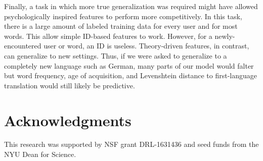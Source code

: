 \documentclass[11pt,a4paper]{article}
\begin{document}
Finally, a task in which more true generalization was required might have
allowed psychologically inspired features to perform more competitively. In this
task, there is a large amount of labeled training data for every user and for
most words. This allow simple ID-based features to work. However, for a
newly-encountered user or word, an ID is useless. Theory-driven features, in
contrast, can generalize to new settings. Thus, if we were asked to generalize to
a completely new language such as German, many parts of our model would falter
but word frequency, age of acquisition, and Levenshtein distance to
first-language translation would still likely be predictive.


\section{Acknowledgments}
This research was supported by NSF grant DRL-1631436 and
seed funds from the NYU Dean for Science.



\end{document}
